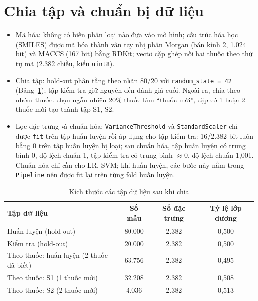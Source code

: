\documentclass[12pt,a4paper,oneside]{report}
\begin{document}
\section{Chia tập và chuẩn bị dữ liệu}
\label{sec:chuanbi}
\begin{itemize}
  \item Mã hóa: không có biến phân loại nào đưa vào mô hình; cấu trúc
        hóa học (SMILES) được mã hóa thành vân tay nhị phân Morgan (bán kính 2,
        1.024 bit) và MACCS (167 bit) bằng RDKit; vectơ cặp ghép nối hai thuốc
        theo thứ tự mã (2.382 chiều, kiểu \texttt{uint8}).
  \item Chia tập: hold-out phân tầng theo nhãn 80/20 với
        \texttt{random\_state = 42} (Bảng~\ref{tab:kichthuoc}); tập kiểm tra giữ
        nguyên đến đánh giá cuối. Ngoài ra, chia theo nhóm thuốc: chọn ngẫu nhiên
        20\% thuốc làm ``thuốc mới'', cặp có 1 hoặc 2 thuốc mới tạo thành tập
        S1, S2.
  \item Lọc đặc trưng và chuẩn hóa: \texttt{VarianceThreshold} và
        \texttt{StandardScaler} chỉ được \texttt{fit} trên tập huấn luyện rồi áp
        dụng cho tập kiểm tra: 16/2.382 bit luôn bằng 0 trên tập huấn luyện bị
        loại; sau chuẩn hóa, tập huấn luyện có trung bình 0, độ lệch chuẩn 1, tập
        kiểm tra có trung bình $\approx 0$, độ lệch chuẩn 1,001. Chuẩn hóa chỉ
        cần cho LR, SVM; khi huấn luyện, các bước này nằm trong \texttt{Pipeline}
        nên được fit lại trên từng fold huấn luyện.
\end{itemize}

\begin{table}[H]
  \centering
  \caption{Kích thước các tập dữ liệu sau khi chia}
  \label{tab:kichthuoc}
  \small
  \begin{tabular}{lccc}
    \toprule
    \textbf{Tập dữ liệu} & \textbf{Số mẫu} & \textbf{Số đặc trưng} & \textbf{Tỷ lệ lớp dương} \\
    \midrule
    Huấn luyện (hold-out) & 80.000 & 2.382 & 0,500 \\
    Kiểm tra (hold-out)   & 20.000 & 2.382 & 0,500 \\
    \midrule
    Theo thuốc: huấn luyện (2 thuốc đã biết) & 63.756 & 2.382 & 0,495 \\
    Theo thuốc: S1 (1 thuốc mới) & 32.208 & 2.382 & 0,508 \\
    Theo thuốc: S2 (2 thuốc mới) & 4.036 & 2.382 & 0,513 \\
    \bottomrule
  \end{tabular}
\end{table}
\end{document}
